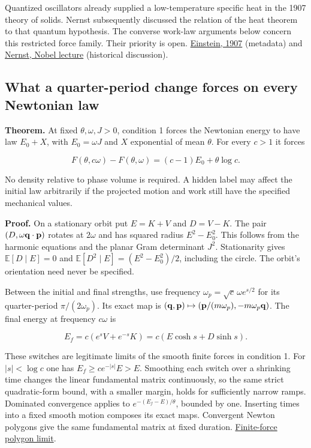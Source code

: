 \documentclass[11pt,a4paper]{article}
\begin{document}
Quantized oscillators already supplied a low-temperature specific heat
in the 1907 theory of solids. Nernst subsequently discussed the relation
of the heat theorem to that quantum hypothesis. The converse work-law
arguments below concern this restricted force family. Their priority is
open. \href{https://doi.org/10.1002/andp.19063270110}{Einstein, 1907}
(metadata) and
\href{https://www.nobelprize.org/uploads/2017/03/nernst-lecture2.pdf}{Nernst,
Nobel lecture} (historical discussion).

\subsection{What a quarter-period change forces on every Newtonian
law}\label{what-a-quarter-period-change-forces-on-every-newtonian-law}

\textbf{Theorem.} At fixed \(\theta,\omega,J>0\), condition 1 forces the
Newtonian energy to have law \(E_0+X\), with \(E_0=\omega J\) and \(X\)
exponential of mean \(\theta\). For every \(c>1\) it forces

\[
 F(\theta,c\omega)-F(\theta,\omega)=(c-1)E_0+\theta\log c.       \tag{1}
\]

No density relative to phase volume is required. A hidden label may
affect the initial law arbitrarily if the projected motion and work
still have the specified mechanical values.

\textbf{Proof.} On a stationary orbit put \(E=K+V\) and \(D=V-K\). The
pair \((D,\omega{\bf q}\cdot{\bf p})\) rotates at \(2\omega\) and has
squared radius \(E^2-E_0^2\). This follows from the harmonic equations
and the planar Gram determinant \(J^2\). Stationarity gives
\(\mathbb E[D\mid E]=0\) and \(\mathbb E[D^2\mid E]=(E^2-E_0^2)/2\),
including the circle. The orbit's orientation need never be specified.

Between the initial and final strengths, use frequency
\(\omega_p=\sqrt c\,\omega e^{s/2}\) for its quarter-period
\(\pi/(2\omega_p)\). Its exact map is
\(({\bf q},{\bf p})\mapsto({\bf p}/(m\omega_p),-m\omega_p{\bf q})\). The
final energy at frequency \(c\omega\) is

\[
 E_f=c(e^s V+e^{-s}K)=c(E\cosh s+D\sinh s).                    \tag{2}
\]

These switches are legitimate limits of the smooth finite forces in
condition 1. For \(|s|<\log c\) one has \(E_f\ge ce^{-|s|}E>E\).
Smoothing each switch over a shrinking time changes the linear
fundamental matrix continuously, so the same strict quadratic-form
bound, with a smaller margin, holds for sufficiently narrow ramps.
Dominated convergence applies to \(e^{-(E_f-E)/\theta}\), bounded by
one. Inserting times into a fixed smooth motion composes its exact maps.
Convergent Newton polygons give the same fundamental matrix at fixed
duration. \href{balaban-ode-lesson.md}{Finite-force polygon limit}.
\end{document}

